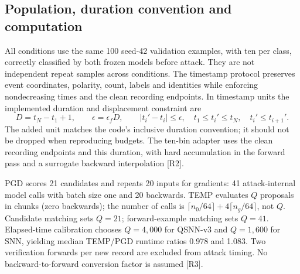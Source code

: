 \documentclass[10pt,onecolumn]{article}
\newcommand{\rref}[1]{\textup{[R#1]}}
\begin{document}
\subsection{Population, duration convention and computation}
All conditions use the same 100 seed-42 validation examples, with ten per class, correctly classified by both frozen models before attack. They are not independent repeat samples across conditions. The timestamp protocol preserves event coordinates, polarity, count, labels and identities while enforcing nondecreasing times and the clean recording endpoints. In timestamp units the implemented duration and displacement constraint are
\begin{equation}
D=t_N-t_1+1,\qquad \epsilon=\epsilon_fD,\qquad
\lvert t_i'-t_i\rvert\leq\epsilon,
\quad t_1\leq t_i'\leq t_N,\quad t_i'\leq t_{i+1}'.
\label{eq:timestamp}
\end{equation}
The added unit matches the code's inclusive duration convention; it should not be dropped when reproducing budgets. The ten-bin adapter uses the clean recording endpoints and this duration, with hard accumulation in the forward pass and a surrogate backward interpolation \rref{2}.

PGD scores 21 candidates and repeats 20 inputs for gradients: 41 attack-internal model calls with batch size one and 20 backwards. TEMP evaluates $Q$ proposals in chunks (zero backwards); the number of calls is $\lceil n_0/64\rceil+4\lceil n_g/64\rceil$, not $Q$. Candidate matching sets $Q=21$; forward-example matching sets $Q=41$. Elapsed-time calibration chooses $Q=4{,}000$ for QSNN-v3 and $Q=1{,}600$ for SNN, yielding median TEMP/PGD runtime ratios 0.978 and 1.083. Two verification forwards per new record are excluded from attack timing. No backward-to-forward conversion factor is assumed \rref{3}.
\end{document}
